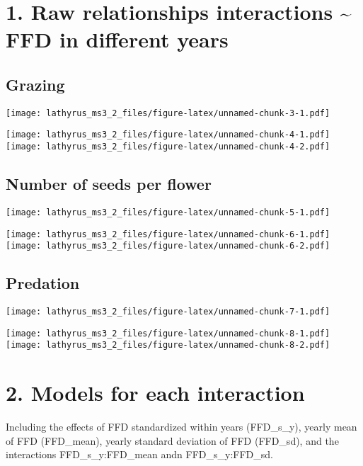 \documentclass[
]{article}
\begin{document}
\hypertarget{raw-relationships-interactions-ffd-in-different-years}{%
\section{1. Raw relationships interactions \textasciitilde{} FFD in
different
years}\label{raw-relationships-interactions-ffd-in-different-years}}

\hypertarget{grazing}{%
\subsection{Grazing}\label{grazing}}

\texttt{[image: lathyrus\_ms3\_2\_files/figure-latex/unnamed-chunk-3-1.pdf]}

\texttt{[image: lathyrus\_ms3\_2\_files/figure-latex/unnamed-chunk-4-1.pdf]}
\texttt{[image: lathyrus\_ms3\_2\_files/figure-latex/unnamed-chunk-4-2.pdf]}

\hypertarget{number-of-seeds-per-flower}{%
\subsection{Number of seeds per
flower}\label{number-of-seeds-per-flower}}

\texttt{[image: lathyrus\_ms3\_2\_files/figure-latex/unnamed-chunk-5-1.pdf]}

\texttt{[image: lathyrus\_ms3\_2\_files/figure-latex/unnamed-chunk-6-1.pdf]}
\texttt{[image: lathyrus\_ms3\_2\_files/figure-latex/unnamed-chunk-6-2.pdf]}

\hypertarget{predation}{%
\subsection{Predation}\label{predation}}

\texttt{[image: lathyrus\_ms3\_2\_files/figure-latex/unnamed-chunk-7-1.pdf]}

\texttt{[image: lathyrus\_ms3\_2\_files/figure-latex/unnamed-chunk-8-1.pdf]}
\texttt{[image: lathyrus\_ms3\_2\_files/figure-latex/unnamed-chunk-8-2.pdf]}

\hypertarget{models-for-each-interaction}{%
\section{2. Models for each
interaction}\label{models-for-each-interaction}}

Including the effects of FFD standardized within years (FFD\_s\_y),
yearly mean of FFD (FFD\_mean), yearly standard deviation of FFD
(FFD\_sd), and the interactions FFD\_s\_y:FFD\_mean andn
FFD\_s\_y:FFD\_sd.
\end{document}

